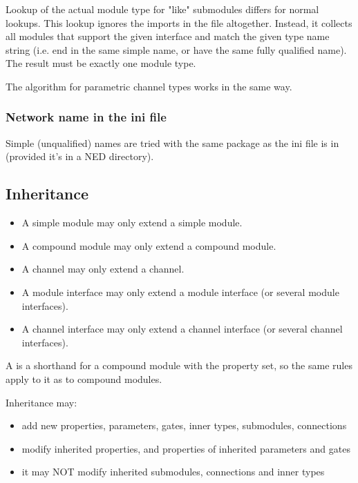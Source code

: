 Lookup of the actual module type for "like" submodules differs for normal
lookups. This lookup ignores the imports in the file altogether.
Instead, it collects all modules that support the given interface
and match the given type name string (i.e. end in the same simple name,
or have the same fully qualified name). The result must be exactly
one module type.

The algorithm for parametric channel types works in the same way.


\subsubsection{Network name in the ini file}

Simple (unqualified) names are tried with the same package as the
ini file is in (provided it's in a NED directory).



\subsection{Inheritance}
\label{ch-ned-ref:sec:inheritance}

\begin{itemize}
  \item A simple module may only extend a simple module.
  \item A compound module may only extend a compound module.
  \item A channel may only extend a channel.
  \item A module interface may only extend a module interface (or several module
        interfaces).
  \item A channel interface may only extend a channel interface (or several
        channel interfaces).
\end{itemize}

A  is a shorthand for a compound module with the 
property set, so the same rules apply to it as to compound modules.

Inheritance may:
\begin{itemize}
  \item add new properties, parameters, gates, inner types, submodules,
        connections
  \item modify inherited properties, and properties of inherited parameters and
        gates
  \item it may NOT modify inherited submodules, connections and inner types
\end{itemize}

